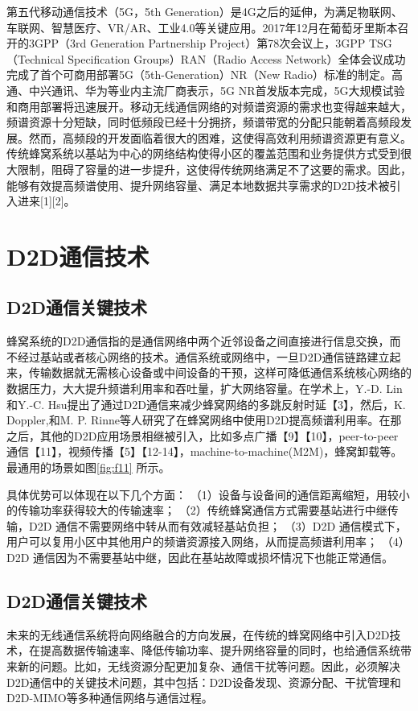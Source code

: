 \documentclass[figurelist,tablelist,algorithmlist,nomlist,masters]{seuthesix}
\begin{document}
	第五代移动通信技术（5G，5th Generation）是4G之后的延伸，为满足物联网、车联网、智慧医疗、VR/AR、工业4.0等关键应用。2017年12月在葡萄牙里斯本召开的3GPP（3rd Generation Partnership Project）第78次会议上，3GPP TSG（Technical Specification Groups）RAN（Radio Access Network）全体会议成功完成了首个可商用部署5G（5th-Generation）NR（New Radio）标准的制定。高通、中兴通讯、华为等业内主流厂商表示，5G NR首发版本完成，5G大规模试验和商用部署将迅速展开。移动无线通信网络的对频谱资源的需求也变得越来越大，频谱资源十分短缺，同时低频段已经十分拥挤，频谱带宽的分配只能朝着高频段发展。然而，高频段的开发面临着很大的困难，这使得高效利用频谱资源更有意义。传统蜂窝系统以基站为中心的网络结构使得小区的覆盖范围和业务提供方式受到很大限制，阻碍了容量的进一步提升，这使得传统网络满足不了这要的需求。因此，能够有效提高频谱使用、提升网络容量、满足本地数据共享需求的D2D技术被引入进来[1][2]。

	\section{D2D通信技术}

	\subsection{D2D通信关键技术}
	蜂窝系统的D2D通信指的是通信网络中两个近邻设备之间直接进行信息交换，而不经过基站或者核心网络的技术。通信系统或网络中，一旦D2D通信链路建立起来，传输数据就无需核心设备或中间设备的干预，这样可降低通信系统核心网络的数据压力，大大提升频谱利用率和吞吐量，扩大网络容量。在学术上，Y.-D. Lin和Y.-C. Hsu提出了通过D2D通信来减少蜂窝网络的多跳反射时延【3】，然后，K. Doppler,和M. P. Rinne等人研究了在蜂窝网络中使用D2D提高频谱利用率。在那之后，其他的D2D应用场景相继被引入，比如多点广播【9】【10】，peer-to-peer 通信【11】，视频传播【5】【12-14】，machine-to-machine(M2M)，蜂窝卸载等。最通用的场景如图\ref{fig:f11} 所示。

	具体优势可以体现在以下几个方面：
	（1）设备与设备间的通信距离缩短，用较小的传输功率获得较大的传输速率；
	（2）传统蜂窝通信方式需要基站进行中继传输，D2D 通信不需要网络中转从而有效减轻基站负担；
	（3）D2D 通信模式下，用户可以复用小区中其他用户的频谱资源接入网络，从而提高频谱利用率；
	（4）D2D 通信因为不需要基站中继，因此在基站故障或损坏情况下也能正常通信。

	\subsection{D2D通信关键技术}
	未来的无线通信系统将向网络融合的方向发展，在传统的蜂窝网络中引入D2D技术，在提高数据传输速率、降低传输功率、提升网络容量的同时，也给通信系统带来新的问题。比如，无线资源分配更加复杂、通信干扰等问题。因此，必须解决D2D通信中的关键技术问题，其中包括：D2D设备发现、资源分配、干扰管理和D2D-MIMO等多种通信网络与通信过程。
\end{document}
